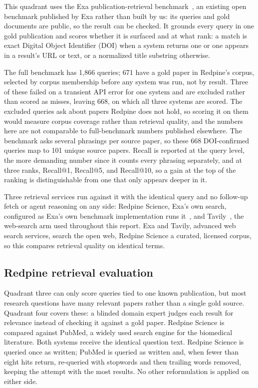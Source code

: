 \documentclass[sn-mathphys,Numbered]{sn-jnl}%
\begin{document}
This quadrant uses the Exa publication-retrieval benchmark~\cite{exabenchmarks}, an
existing open benchmark published by Exa rather than built by us: its queries and gold
documents are public, so the result can be checked. It grounds every query in one
gold publication and scores whether it is surfaced and at what rank: a match is exact
Digital Object Identifier (DOI) when a system returns one or one appears in a result's
URL or text, or a normalized title substring otherwise.

The full benchmark has 1,866 queries; 671 have a gold paper in Redpine's corpus,
selected by corpus membership before any system was run, not by result. Three of these
failed on a transient API error for one system and are excluded rather than scored as
misses, leaving 668, on which all three systems are scored. The excluded queries ask about papers Redpine does not hold, so scoring it on
them would measure corpus coverage rather than retrieval quality, and the numbers here
are not comparable to full-benchmark numbers published elsewhere. The benchmark asks several phrasings per source paper, so these
668 DOI-confirmed queries map to 101 unique source papers. Recall is reported at the
query level, the more demanding number since it counts every phrasing separately, and at
three ranks, Recall@1, Recall@5, and Recall@10, so a gain at the top of the ranking is
distinguishable from one that only appears deeper in it.

Three retrieval services run against it with the identical query and no follow-up
fetch or agent reasoning on any side: Redpine Science, Exa's own search, configured as
Exa's own benchmark implementation runs it~\cite{exabenchmarks}, and Tavily~\cite{tavily}, the web-search arm
used throughout this report. Exa and Tavily, advanced web search services, search the
open web, Redpine Science a curated, licensed corpus, so this compares retrieval
quality on identical terms.

\subsection{Redpine retrieval evaluation}\label{sec:method-quadrant-four}

Quadrant three can only score queries tied to one known publication, but most research
questions have many relevant papers rather than a single gold source. Quadrant four
covers these: a blinded domain expert judges each result for relevance instead of
checking it against a gold paper. Redpine Science is compared against PubMed, a widely used search
engine for the biomedical literature. Both systems receive the identical question text. Redpine Science is
queried once as written; PubMed is queried as written and, when fewer than eight hits
return, re-queried with stopwords and then trailing words removed, keeping the attempt
with the most results. No other reformulation is applied on either side.
\end{document}
